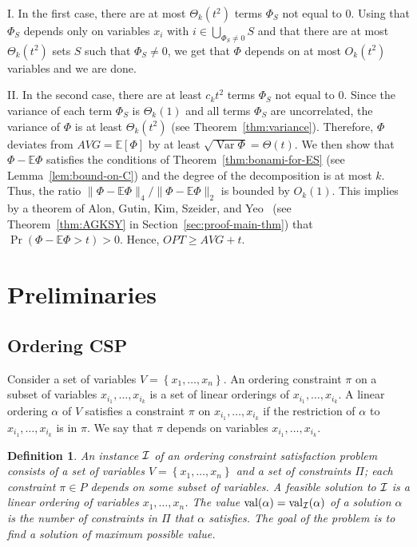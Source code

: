\documentclass[11pt]{article}
\DeclareMathOperator {\val}  {val}
\DeclareMathOperator {\Var}  {Var}
\newcommand {\set}   [1] {\left\{ #1 \right\}}
\newcommand {\Exp}       {\mathbb{E}}
\newcommand {\E}     [1] {\Exp\left[#1\right]}
\newtheorem{definition}[theorem]{Definition}
\begin{document}
I. In the first case, there are at most $\Theta_k(t^2)$  terms $\Phi_S$  not equal to $0$. Using that $\Phi_S$ depends only on variables $x_i$ with $i\in \bigcup_{\Phi_S \neq 0} S$ and that there are at most $\Theta_k(t^2)$ sets $S$ such that $\Phi_S \neq 0$, we get that $\Phi$ depends on at most $O_k(t^2)$ variables and we are done.

II. In the second case, there are at least $c_k t^2$  terms $\Phi_S$  not equal to $0$. Since the variance of each term $\Phi_S$ is $\Theta_k(1)$ and all terms $\Phi_S$ are uncorrelated, the variance of $\Phi$ is at least $\Theta_k(t^2)$ (see Theorem~\ref{thm:variance}). Therefore, $\Phi$ deviates from $AVG = \E{\Phi}$ by at least $\sqrt{\Var{\Phi}} = \Theta(t)$. We then show that $\Phi-\Exp\Phi$ satisfies the conditions of Theorem~\ref{thm:bonami-for-ES} (see Lemma~\ref{lem:bound-on-C}) and the degree of the decomposition is at most $k$.
Thus, the ratio $\|\Phi-\Exp\Phi\|_4/\|\Phi-\Exp\Phi\|_2$ is bounded by $O_k(1)$. This implies by a theorem of Alon, Gutin, Kim, Szeider, and Yeo~\cite{AGKSY} (see Theorem~\ref{thm:AGKSY} in Section~\ref{sec:proof-main-thm})
that $\Pr (\Phi-\Exp\Phi > t)> 0$. Hence, $OPT \geq AVG + t$.

 



\section{Preliminaries}\label{sec:prelim}
\subsection{Ordering CSP}\label{sec:prelim-order-csp}
Consider a set of variables $V = \set{x_1,\dots, x_n}$.
An ordering constraint $\pi$ on
a subset of variables $x_{i_1}, \dots, x_{i_k}$
is a set of linear orderings of
$x_{i_1}, \dots, x_{i_k}$.
A linear ordering $\alpha$ of $V$  satisfies a constraint $\pi$ on $x_{i_1}, \dots, x_{i_k}$ if the restriction of $\alpha$ to
$x_{i_1}, \dots, x_{i_k}$ is in $\pi$.
We say that $\pi$ depends on variables $x_{i_1}, \dots, x_{i_k}$.
\begin{definition}
An instance $\cal I$ of an ordering constraint satisfaction problem consists of a set of variables $V = \set{x_1,\dots, x_n}$ and a set of constraints $\Pi$;
each constraint $\pi \in P$ depends on some subset of variables.
A feasible solution to $\cal I$ is a linear ordering of
variables $x_1,\dots, x_n$. The value $\val(\alpha) = \val_{\cal I} (\alpha)$ of a solution $\alpha$ is the number of constraints in $\Pi$ that $\alpha$ satisfies. The goal of the problem is to find a solution of maximum possible value.
\end{definition}
\end{document}
